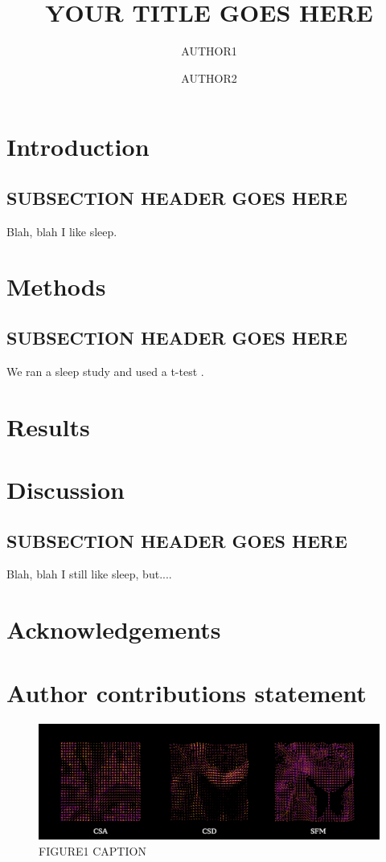 \documentclass[fleqn,10pt]{wlscirep}
\title{YOUR TITLE GOES HERE}
\author[1,*]{AUTHOR1}
\author[1,*]{AUTHOR2}
\affil[*]{EMAIL}
\begin{document}
\maketitle

\section*{Introduction}
\subsection{SUBSECTION HEADER GOES HERE}
Blah, blah I like sleep.

\section*{Methods}
\subsection{SUBSECTION HEADER GOES HERE}
We ran a sleep study and used a t-test \cite{students_t_1908}.

\section*{Results}


\section*{Discussion}
\subsection{SUBSECTION HEADER GOES HERE}
Blah, blah I still like sleep, but....

\printbibliography{}

\section*{Acknowledgements}

\section*{Author contributions statement}

\begin{figure}
\centering
\includegraphics[width=\linewidth, angle=0, scale=1.0, keepaspectratio=true]{figures/SAMPLE_FIGURE_1.png}
\caption{FIGURE1 CAPTION}
\label{fig:FIGURE1_LABEL}
\end{figure}
\end{document}
